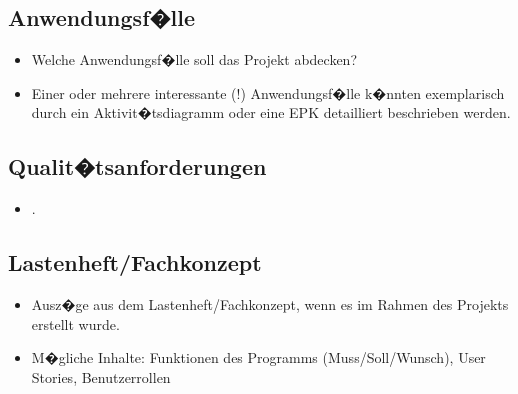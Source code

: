 \subsection{Anwendungsf�lle}
\label{sec:Anwendungsfaelle}
\begin{itemize}
	\item Welche Anwendungsf�lle soll das Projekt abdecken?
	\item Einer oder mehrere interessante (!) Anwendungsf�lle k�nnten exemplarisch durch ein Aktivit�tsdiagramm oder eine EPK detailliert beschrieben werden. 
\end{itemize}



\subsection{Qualit�tsanforderungen}
\label{sec:Qualitaetsanforderungen}
\begin{itemize}
	\item .
\end{itemize}


\subsection{Lastenheft/Fachkonzept}
\label{sec:Lastenheft}
\begin{itemize}
	\item Ausz�ge aus dem Lastenheft/Fachkonzept, wenn es im Rahmen des Projekts erstellt wurde.
	\item M�gliche Inhalte: Funktionen des Programms (Muss/Soll/Wunsch), User Stories, Benutzerrollen
\end{itemize}


